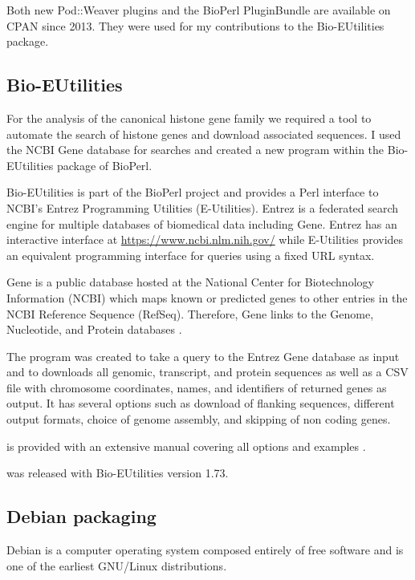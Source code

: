 Both new Pod::Weaver plugins and the BioPerl PluginBundle are available
on CPAN since 2013.  They were used for my contributions to the
Bio-EUtilities package.

\subsection{Bio-EUtilities}

For the analysis of the canonical histone gene
family  we required a tool to
automate the search of histone genes and download associated sequences.
I used the NCBI Gene database for searches and
created a new program 
within the Bio-EUtilities package of BioPerl.

Bio-EUtilities is part of the BioPerl project and provides a Perl
interface to NCBI's Entrez Programming Utilities (E-Utilities).
Entrez is a federated search engine for multiple databases of
biomedical data including Gene.  Entrez has an
interactive interface at \url{https://www.ncbi.nlm.nih.gov/} while
E-Utilities provides an equivalent
programming interface for queries using a fixed
URL syntax.

Gene is a public database hosted at the National Center for
Biotechnology Information (NCBI) which maps known or predicted genes
to other entries in the NCBI Reference Sequence (RefSeq).  Therefore, Gene
links to the Genome, Nucleotide, and Protein databases \citep{gene-database}.

The program  was
created to take a query to the Entrez Gene database as input and
to downloads all genomic, transcript, and protein sequences as well
as a CSV file with chromosome coordinates, names, and identifiers of
returned genes as output.
It has several options such as download of flanking sequences, different
output formats, choice of genome assembly, and skipping of non coding
genes.

is provided with an extensive manual covering all options
and examples .

 was released with
Bio-EUtilities version 1.73.

\subsection{Debian packaging}

Debian is a computer operating system
composed entirely of free software and is one of the earliest GNU/Linux
distributions.


